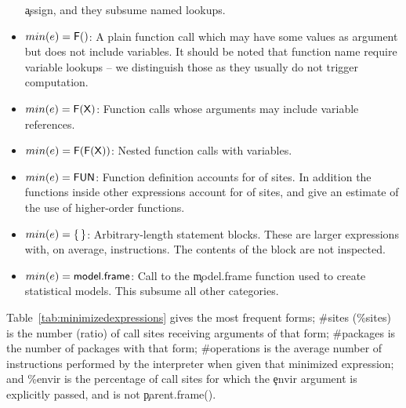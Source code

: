 \documentclass[screen,acmsmall]{acmart}
\begin{document}
\begin{itemize}
  \c{assign}, and they subsume named lookups.
\item \underline{$min(e)={\sf F()}$}: A plain function call which may have some
  values as argument but does not include variables. It should be noted that
  function name require variable lookups -- we distinguish those as they usually
  do not trigger computation.
\item \underline{$min(e)={\sf F(X)}$}: Function calls whose arguments may include
  variable references.
\item \underline{$min(e)={\sf F(F(X))}$}: Nested function calls with variables.
\item \underline{$min(e)={\sf FUN}$}: Function definition accounts for
  \packageFunctionDefinitionSitesPercent of \eval sites. In addition the
  functions inside other expressions account for
  \packageGeneralizedFunctionDefinitionSitesPercent of sites, and give an
  estimate of the use of higher-order functions.
\item \underline{$min(e)={\sf \{\,\}}$}: Arbitrary-length statement blocks. These
  are larger expressions with, on average, \packageMinimizedoperationsjRnd
  instructions. The contents of the block are not inspected.
\item \underline{$min(e)={\sf model.frame}$}: Call to the \c{model.frame} function
  used to create statistical models. This subsume all other categories.

\end{itemize}

Table~\ref{tab:minimizedexpressions} gives the most frequent forms; \#sites
(\%sites) is the number (ratio) of call sites receiving arguments of that form;
\#packages is the number of packages with that form; \#operations is the average
number of instructions performed by the interpreter when given that minimized
expression; and \%envir is the percentage of call sites for which the \c{envir}
argument is explicitly passed, and is not \c{parent.frame()}.
\end{document}
